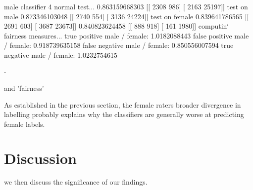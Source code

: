 \documentclass[sigconf]{acmart}
\begin{document}

male classifier 4
normal test...
0.863159668303
[[ 2308   986]
 [ 2163 25197]]
test on male
0.873346103048
[[ 2740   554]
 [ 3136 24224]]
test on female
0.839641786565
[[ 2691   603]
 [ 3687 23673]]
0.840823624458
[[ 888  918]
 [ 161 1980]]
computin` fairness measures...
true positive male / female: 1.0182088443
false positive male / female: 0.918739635158 
false negative male / female: 0.850556007594 
true negative male / female: 1.0232754615

-


and 'fairness'





As established in the previous section, the female raters broader divergence in labelling probably explains why the classifiers are generally worse at predicting female labels.

\section{Discussion}

we then discuss the significance of our findings.
\end{document}
